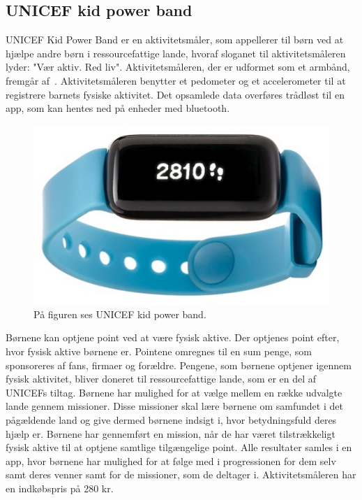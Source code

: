 \subsection{UNICEF kid power band}
UNICEF Kid Power Band er en aktivitetsmåler, som appellerer til børn ved at hjælpe andre børn i ressourcefattige lande, hvoraf sloganet til aktivitetsmåleren lyder: "Vær aktiv. Red liv".
Aktivitetsmåleren, der er udformet som et armbånd, fremgår af~. Aktivitetsmåleren benytter et pedometer og et accelerometer til at registrere barnets fysiske aktivitet. Det opsamlede data overføres trådløst til en app, som kan hentes ned på enheder med bluetooth. \citep{PowerAbout2015,PowerManual2015}

\begin{figure}[H]
	\centering
	\includegraphics[scale=0.55]{figures/aProblemanalyse/unicef.png}
	\caption{På figuren ses UNICEF kid power band. \cite{Unicef2016}}
	\label{fig:unicef}
\end{figure}
Børnene kan optjene point ved at være fysisk aktive. Der optjenes point efter, hvor fysisk aktive børnene er. Pointene omregnes til en sum penge, som sponsoreres af fans, firmaer og forældre. Pengene, som børnene optjener igennem fysisk aktivitet, bliver doneret til ressourcefattige lande, som er en del af UNICEFs tiltag. %
Børnene har mulighed for at vælge mellem en række udvalgte lande gennem missioner. Disse missioner skal lære børnene om samfundet i det pågældende land og give dermed børnene indsigt i, hvor betydningsfuld deres hjælp er. Børnene har gennemført en mission, når de har været tilstrækkeligt fysisk aktive til at optjene samtlige tilgængelige point. Alle resultater samles i en app, hvor børnene har mulighed for at følge med i progressionen for dem selv samt deres venner samt for de missioner, som de deltager i. Aktivitetsmåleren har en indkøbspris på 280 kr. \citep{PowerAbout2015,PowerManual2015}

